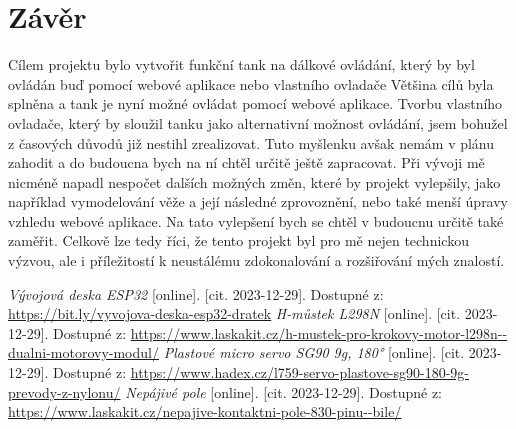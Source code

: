 \documentclass[12pt, a4paper,
oneside
openany
]{report}
\begin{document}
	\chapter*{Závěr}
	
Cílem projektu bylo vytvořit funkční tank na dálkové ovládání, který by byl ovládán buď pomocí webové aplikace nebo vlastního ovladače Většina cílů byla splněna a tank je nyní možné ovládat pomocí webové aplikace. Tvorbu vlastního ovladače, který by sloužil tanku jako alternativní možnost ovládání, jsem bohužel z časových důvodů již nestihl zrealizovat. Tuto myšlenku avšak nemám v plánu zahodit a do budoucna bych na ní chtěl určitě ještě zapracovat. Při vývoji mě nicméně napadl nespočet dalších možných změn, které by projekt vylepšily, jako například vymodelování věže a její následné zprovoznění, nebo také menší úpravy vzhledu webové aplikace. Na tato vylepšení bych se chtěl v budoucnu určitě také zaměřit. Celkově lze tedy říci, že tento projekt byl pro mě nejen technickou výzvou, ale i příležitostí k neustálému zdokonalování a rozšiřování mých znalostí.
	
	\begin{thebibliography}{99}
		 \textit{Vývojová deska ESP32} [online]. [cit. 2023-12-29]. Dostupné z: \url{https://bit.ly/vyvojova-deska-esp32-dratek}
		\textit{H-můstek L298N} [online]. [cit. 2023-12-29]. Dostupné z: \url{https://www.laskakit.cz/h-mustek-pro-krokovy-motor-l298n--dualni-motorovy-modul/}
        \textit{Plastové micro servo SG90 9g, 180°} [online]. [cit. 2023-12-29]. Dostupné z: \url{https://www.hadex.cz/l759-servo-plastove-sg90-180-9g-prevody-z-nylonu/}
        \textit{Nepájivé pole} [online]. [cit. 2023-12-29]. Dostupné z: \url{https://www.laskakit.cz/nepajive-kontaktni-pole-830-pinu--bile/}
	\end{thebibliography}
	
	\listoffigures
	
	
	[\vspace{-22pt}] %
\end{document}
